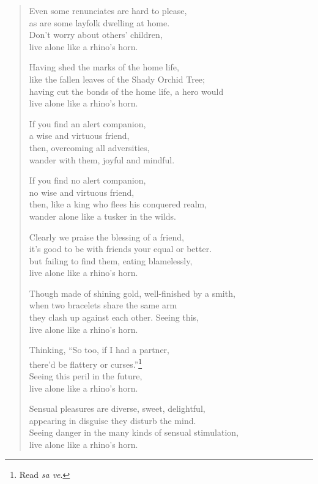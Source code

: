 \documentclass[12pt,openany]{book}%
\begin{document}
\begin{verse}
Even some renunciates are hard to please, \\
as are some layfolk dwelling at home. \\
Don’t worry about others’ children, \\
live alone like a rhino’s horn. 

Having shed the marks of the home life, \\
like the fallen leaves of the Shady Orchid Tree; \\
having cut the bonds of the home life, a hero would \\
live alone like a rhino’s horn. 

If you find an alert companion, \\
a wise and virtuous friend, \\
then, overcoming all adversities, \\
wander with them, joyful and mindful. 

If you find no alert companion, \\
no wise and virtuous friend, \\
then, like a king who flees his conquered realm, \\
wander alone like a tusker in the wilds. 

Clearly we praise the blessing of a friend, \\
it’s good to be with friends your equal or better. \\
but failing to find them, eating blamelessly, \\
live alone like a rhino’s horn. 

Though made of shining gold, well-finished by a smith, \\
when two bracelets share the same arm \\
they clash up against each other. Seeing this, \\
live alone like a rhino’s horn. 

Thinking, “So too, if I had a partner, \\
there’d be flattery or curses.”\footnote{Read \textit{sa ve}. } \\
Seeing this peril in the future, \\
live alone like a rhino’s horn. 

Sensual pleasures are diverse, sweet, delightful, \\
appearing in disguise they disturb the mind. \\
Seeing danger in the many kinds of sensual stimulation, \\
live alone like a rhino’s horn. 


\end{verse}
\end{document}
